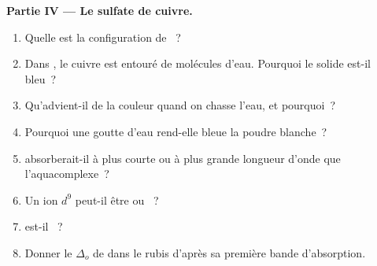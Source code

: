 \begin{problem}
\medskip
\noindent\textbf{Partie IV --- Le sulfate de cuivre.}
\begin{enumerate}[resume]
  \item Quelle est la configuration de ~?
  \item Dans , le cuivre est entouré de molécules d'eau. Pourquoi le solide est-il bleu~?
  \item Qu'advient-il de la couleur quand on chasse l'eau, et pourquoi~?
  \item Pourquoi une goutte d'eau rend-elle bleue la poudre blanche~?
  \item {} absorberait-il à plus courte ou à plus grande longueur d'onde que l'aquacomplexe~?
  \item Un ion $d^9$ peut-il être  ou ~?
  \item {} est-il ~?
  \item Donner le $\Delta_o$ de  dans le rubis d'après sa première bande d'absorption.
\end{enumerate}
\end{problem}
